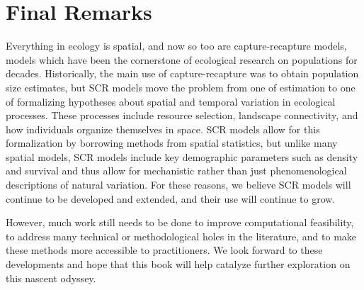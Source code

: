 \section{Final Remarks}

Everything in ecology is spatial, and now so too are capture-recapture
models, models which have been the cornerstone of ecological research
on populations for decades.  Historically, the main use of
capture-recapture was to obtain population size estimates, but SCR
models move the problem from one of estimation to one of formalizing
hypotheses about spatial and temporal variation in ecological
processes.  These processes include resource selection, landscape
connectivity, and how individuals organize themselves in space. SCR
models allow for this formalization by borrowing methods from spatial
statistics, but unlike many spatial models, SCR models include key
demographic parameters such as density and survival and thus allow for
mechanistic rather than just phenomenological descriptions of natural
variation.  For these reasons, we believe SCR models will continue to
be developed and extended, and their use will continue to grow.

However, much work still needs to be done to improve computational
feasibility, to address many technical or methodological holes in the
literature, and to make these methods more accessible to
practitioners.  We look forward to these developments and hope that
this book will help catalyze further exploration on this nascent
odyssey.













